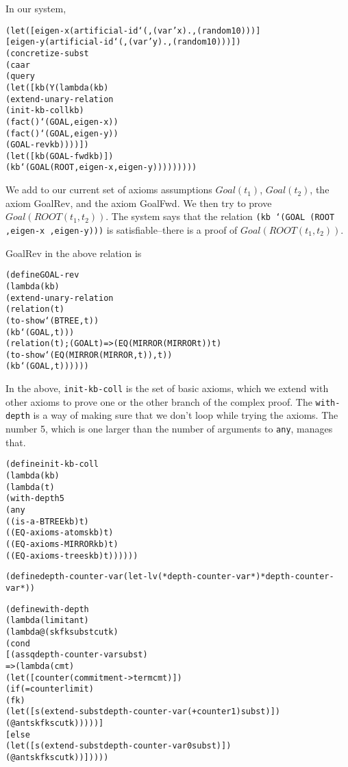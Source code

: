 In our system,
\begin{alltt}
(let ([eigen-x (artificial-id `(,(var 'x) . ,(random 10)))]
        [eigen-y (artificial-id `(,(var 'y) . ,(random 10)))])
    (concretize-subst
      (caar
        (query
          (let ([kb (Y (lambda (kb)
                         (extend-unary-relation
                           (init-kb-coll kb)
                           (fact () `(GOAL ,eigen-x))
                           (fact () `(GOAL ,eigen-y))
                           (GOAL-rev kb))))])
            (let ([kb (GOAL-fwd kb)])
              (kb `(GOAL (ROOT ,eigen-x ,eigen-y)))))))))
\end{alltt}

We add to our current set of axioms assumptions $Goal(t_{1})$, $Goal(t_{2})$,
the axiom GoalRev, and the axiom GoalFwd. We then try to
prove $Goal(ROOT(t_{1},t_{2}))$. The system says that the relation
\texttt{(kb `(GOAL (ROOT ,eigen-x ,eigen-y)))} is satisfiable--there is a
proof of $Goal(ROOT(t_{1},t_{2}))$.

GoalRev in the above relation is
\begin{alltt}
(define GOAL-rev
  (lambda (kb)
    (extend-unary-relation
      (relation (t)
        (to-show `(BTREE ,t))
        (kb `(GOAL ,t)))
      (relation (t)                ; (GOAL t) => (EQ (MIRROR (MIRROR t)) t)
        (to-show `(EQ (MIRROR (MIRROR ,t)) ,t))
        (kb `(GOAL ,t))))))
\end{alltt}

In the above, \texttt{init-kb-coll} is the set of basic axioms, which we extend
with other axioms to prove one or the other branch of the complex
proof.  The \texttt{with-depth} is a way of making
sure that we don't loop while trying the axioms.  The number 5, which
is one larger than the number of arguments to \texttt{any}, manages
that.

\begin{alltt}
(define init-kb-coll
  (lambda (kb)
    (lambda (t)
      (with-depth 5
        (any
          ((is-a-BTREE kb) t)
          ((EQ-axioms-atoms kb) t)
          ((EQ-axioms-MIRROR kb) t)
          ((EQ-axioms-trees kb) t))))))

(define depth-counter-var (let-lv (*depth-counter-var*) *depth-counter-var*))

(define with-depth
  (lambda (limit ant)
    (lambda@ (sk fk subst cutk)
      (cond
        [(assq depth-counter-var subst)
         => (lambda (cmt)
              (let ([counter (commitment->term cmt)])
                (if (= counter limit)
                  (fk)
                  (let ([s (extend-subst depth-counter-var (+ counter 1) subst)])
                    (@ ant sk fk s cutk)))))]
        [else
          (let ([s (extend-subst depth-counter-var 0 subst)])
            (@ ant sk fk s cutk))]))))
\end{alltt}

